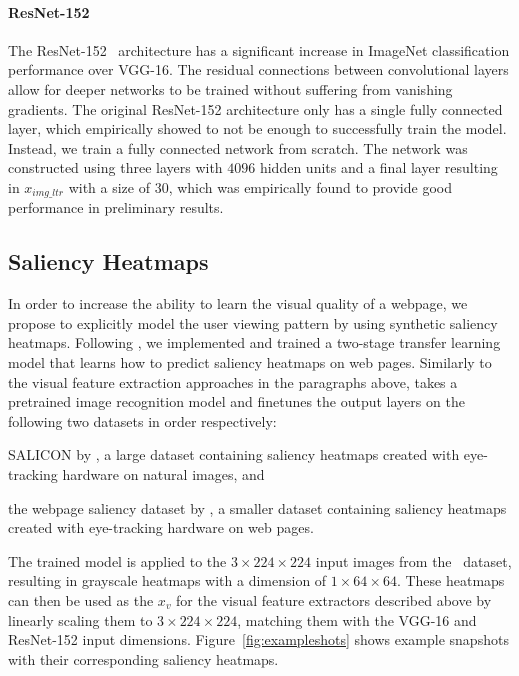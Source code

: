 \paragraph{ResNet-152}
The ResNet-152~\cite{he2016deep} architecture has a significant increase in ImageNet classification performance over VGG-16. The residual connections between convolutional layers allow for deeper networks to be trained without suffering from vanishing gradients. The original ResNet-152 architecture only has a single fully connected layer, which empirically showed to not be enough to successfully train the model. Instead, we train a fully connected network from scratch. The network was constructed using three layers with $4096$ hidden units and a final layer resulting in $x_{img\_ltr}$ with a size of $30$, which was empirically found to provide good performance in preliminary results.

\subsection{Saliency Heatmaps}
In order to increase the ability to learn the visual quality of a webpage, we propose to explicitly model the user viewing pattern by using synthetic saliency heatmaps. 
Following \cite{shan2017two}, we implemented and trained a two-stage transfer learning model that learns how to predict saliency heatmaps on web pages.
Similarly to the visual feature extraction approaches in the paragraphs above, \cite{shan2017two} takes a pretrained image recognition model and finetunes the output layers on the following two datasets in order respectively:
\begin{inparaenum}[(i)]
\item SALICON by \cite{jiang2015salicon}, a large dataset containing saliency heatmaps created with eye-tracking hardware on natural images, and 
\item the webpage saliency dataset by \cite{shen2014webpage}, a smaller dataset containing saliency heatmaps created with eye-tracking hardware on web pages.
\end{inparaenum}

The trained model is applied to the $3\times224\times224$ input images from the \datasetname~data\-set, resulting in grayscale heatmaps with a dimension of $1\times64\times64$. These heatmaps can then be used as the $x_{v}$ for the visual feature extractors described above by linearly scaling them to $3\times224\times224$, matching them with the VGG-16 and ResNet-152 input dimensions. Figure~\ref{fig:exampleshots} shows example snapshots with their corresponding saliency heatmaps.

